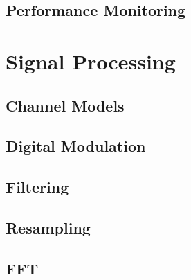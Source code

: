 \documentclass[10pt]{article}
\begin{document}
\begin{multicols*}{3}
\subsection{Performance Monitoring}

\section{Signal Processing}

\subsection{Channel Models}

\subsection{Digital Modulation}

\subsection{Filtering}

\subsection{Resampling}

\subsection{FFT}

\end{multicols*}
\end{document}
